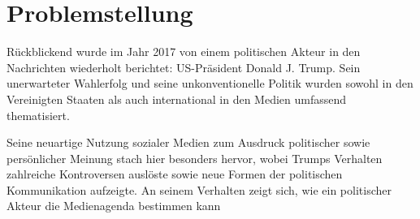\section{Problemstellung}
\label{sec:problemstellung}

Rückblickend wurde im Jahr 2017 von einem politischen Akteur in den Nachrichten wiederholt berichtet: US-Präsident Donald J. Trump. Sein unerwarteter Wahlerfolg und seine unkonventionelle Politik wurden sowohl in den Vereinigten Staaten als auch international in den Medien umfassend thematisiert. 

Seine neuartige Nutzung sozialer Medien zum Ausdruck politischer sowie persönlicher Meinung stach hier besonders hervor, wobei Trumps Verhalten zahlreiche Kontroversen auslöste sowie neue Formen der politischen Kommunikation aufzeigte. An seinem Verhalten zeigt sich, wie ein politischer Akteur die Medienagenda bestimmen kann
